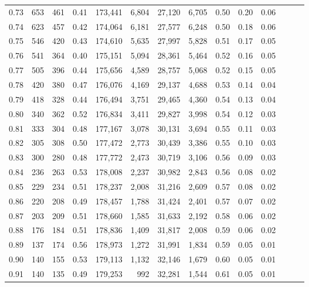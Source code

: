 \begin{tabular}{rrrrrrrrrrrrrr}
0.73 &    653 &  461 &  0.41 &  173,441 &    6,804 &  27,120 &   6,705 &  0.50 &  0.20 &      0.06 \\
0.74 &    623 &  457 &  0.42 &  174,064 &    6,181 &  27,577 &   6,248 &  0.50 &  0.18 &      0.06 \\
0.75 &    546 &  420 &  0.43 &  174,610 &    5,635 &  27,997 &   5,828 &  0.51 &  0.17 &      0.05 \\
0.76 &    541 &  364 &  0.40 &  175,151 &    5,094 &  28,361 &   5,464 &  0.52 &  0.16 &      0.05 \\
0.77 &    505 &  396 &  0.44 &  175,656 &    4,589 &  28,757 &   5,068 &  0.52 &  0.15 &      0.05 \\
0.78 &    420 &  380 &  0.47 &  176,076 &    4,169 &  29,137 &   4,688 &  0.53 &  0.14 &      0.04 \\
0.79 &    418 &  328 &  0.44 &  176,494 &    3,751 &  29,465 &   4,360 &  0.54 &  0.13 &      0.04 \\
0.80 &    340 &  362 &  0.52 &  176,834 &    3,411 &  29,827 &   3,998 &  0.54 &  0.12 &      0.03 \\
0.81 &    333 &  304 &  0.48 &  177,167 &    3,078 &  30,131 &   3,694 &  0.55 &  0.11 &      0.03 \\
0.82 &    305 &  308 &  0.50 &  177,472 &    2,773 &  30,439 &   3,386 &  0.55 &  0.10 &      0.03 \\
0.83 &    300 &  280 &  0.48 &  177,772 &    2,473 &  30,719 &   3,106 &  0.56 &  0.09 &      0.03 \\
0.84 &    236 &  263 &  0.53 &  178,008 &    2,237 &  30,982 &   2,843 &  0.56 &  0.08 &      0.02 \\
0.85 &    229 &  234 &  0.51 &  178,237 &    2,008 &  31,216 &   2,609 &  0.57 &  0.08 &      0.02 \\
0.86 &    220 &  208 &  0.49 &  178,457 &    1,788 &  31,424 &   2,401 &  0.57 &  0.07 &      0.02 \\
0.87 &    203 &  209 &  0.51 &  178,660 &    1,585 &  31,633 &   2,192 &  0.58 &  0.06 &      0.02 \\
0.88 &    176 &  184 &  0.51 &  178,836 &    1,409 &  31,817 &   2,008 &  0.59 &  0.06 &      0.02 \\
0.89 &    137 &  174 &  0.56 &  178,973 &    1,272 &  31,991 &   1,834 &  0.59 &  0.05 &      0.01 \\
0.90 &    140 &  155 &  0.53 &  179,113 &    1,132 &  32,146 &   1,679 &  0.60 &  0.05 &      0.01 \\
0.91 &    140 &  135 &  0.49 &  179,253 &      992 &  32,281 &   1,544 &  0.61 &  0.05 &      0.01 \\

\end{tabular}

